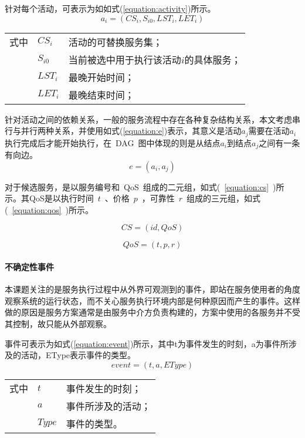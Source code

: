 针对每个活动，可表示为如如式(\ref{equation:activity})所示。
\begin{equation}\label{equation:activity}
{a_i} = ({CS_i}, {S_{i0}}, {LST_i}, {LET_i})
\end{equation}
\begin{tabularx}{\textwidth}{@{}l@{\quad}l@{\pozhehao }X@{}}
    式中
    & ${CS_i}$ & 活动的可替换服务集；\\
    & ${S_{i0}}$ & 当前被选中用于执行该活动$i$的具体服务；\\
    & ${LST_i}$ & 最晚开始时间；\\
    & ${LET_i}$ & 最晚结束时间；
\end{tabularx}\vspace{\wordsep}

针对活动之间的依赖关系，一般的服务流程中存在各种复杂结构关系，本文考虑串行与并行两种关系，并使用如式(\ref{equation:e})表示，其意义是活动${a_j}$需要在活动${a_i}$执行完成后才能开始执行，在~DAG~图中体现的则是从结点${a_i}$到结点${a_j}$之间有一条有向边。
\begin{equation}\label{equation:e}
e = ({a_i},{a_j})
\end{equation}

对于候选服务，是以服务编号和~QoS~组成的二元组，如式(~\ref{equation:cs}~)所示。其QoS是以执行时间~$t$~、价格~$p$~，可靠性~$r$~组成的三元组，如式(~\ref{equation:qos}~)所示。

\begin{equation}\label{equation:cs}
CS = (id, QoS)
\end{equation}

\begin{equation}\label{equation:qos}
QoS = (t, p, r)
\end{equation}

\paragraph{不确定性事件} 

本课题关注的是服务执行过程中从外界可观测到的事件，即站在服务使用者的角度观察系统的运行状态，而不关心服务执行环境内部是何种原因而产生的事件。这样做的原因是服务方案通常是由服务中介方负责构建的，方案中使用的各服务并不受其控制，故只能从外部观察。

事件可表示为如式(\ref{equation:event})所示，其中t为事件发生的时刻，a为事件所涉及的活动，EType表示事件的类型。
\begin{equation}\label{equation:event}
event = (t, a, EType)
\end{equation}
\begin{tabularx}{\textwidth}{@{}l@{\quad}l@{\pozhehao }X@{}}
    式中
    & $t$ & 事件发生的时刻；\\
    & $a$ & 事件所涉及的活动；\\
    & $Type$ &事件的类型。
\end{tabularx}\vspace{\wordsep}

